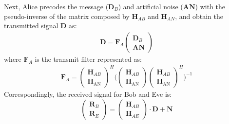 Next, Alice precodes the message ($\mathbf{D}_B$) and artificial noise ($\textbf{AN}$) with the pseudo-inverse of the matrix composed by $\mathbf{H}_{AB}$ and $\mathbf{H}_{AN}$, and obtain the transmitted signal $\mathbf{D}$ as:
\begin{gather}
    \mathbf{D} = \mathbf{F}_A\begin{pmatrix}
        \mathbf{D}_B\\
        \textbf{AN}
    \end{pmatrix} 
    \label{eq:data}
\end{gather}
where $\mathbf{F}_A$ is the transmit filter represented as:
\begin{gather}
    \mathbf{F}_A = \begin{pmatrix}
        \mathbf{H}_{AB}\\
        \mathbf{H}_{\text{AN}}
    \end{pmatrix}
    ^{H}
    \Bigg(
        \begin{pmatrix}
            \mathbf{H}_{AB}\\
            \mathbf{H}_{\text{AN}}
        \end{pmatrix}
        \begin{pmatrix}
            \mathbf{H}_{AB}\\
            \mathbf{H}_{\text{AN}}
        \end{pmatrix}
    ^{H}
    \Bigg)^{-1}
    \label{eq:F_A}
\end{gather}
Correspondingly, the received signal for Bob and Eve is:
\begin{equation}
    \begin{pmatrix}
    \mathbf{R}_B \\ \mathbf{R}_E
    \end{pmatrix} = 
    \begin{pmatrix}\mathbf{H}_{AB} \\ \mathbf{H}_{AE}
    \end{pmatrix} \cdot 
    \mathbf{D} + \mathbf{N}
\end{equation}

